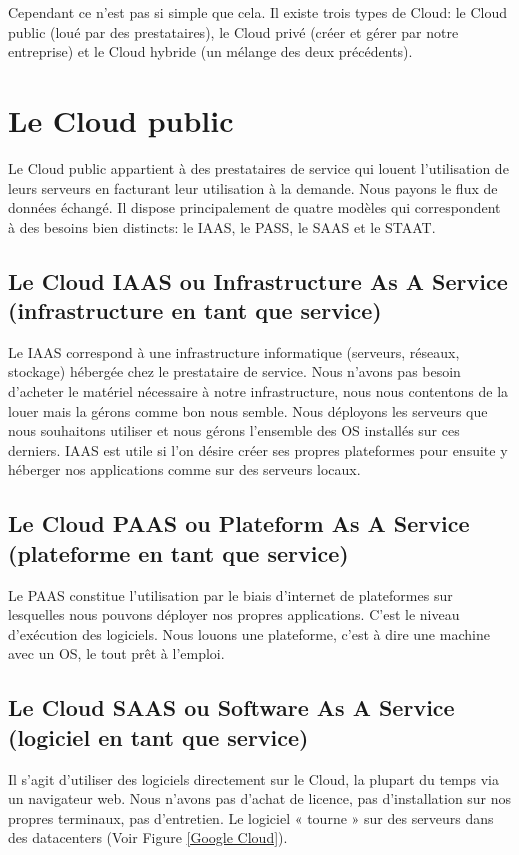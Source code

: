   Cependant ce n’est pas si simple que cela. Il existe trois types de Cloud: le Cloud public (loué par des prestataires), le Cloud privé (créer et gérer par notre entreprise) et le Cloud hybride (un mélange des deux précédents).

  \section{Le Cloud public}
  Le Cloud public appartient à des prestataires de service qui louent l’utilisation de leurs serveurs en facturant leur utilisation à la demande. Nous payons le flux de données échangé. Il dispose principalement de quatre modèles qui correspondent à des besoins bien distincts: le IAAS, le PASS, le SAAS et le STAAT.

    \subsection{Le Cloud IAAS ou Infrastructure As A Service (infrastructure en tant que service)}
    Le IAAS correspond à une infrastructure informatique (serveurs, réseaux, stockage) hébergée chez le prestataire de service. Nous n’avons pas besoin d’acheter le matériel nécessaire à notre infrastructure, nous nous contentons de la louer mais la gérons comme bon nous semble. Nous déployons les serveurs que nous souhaitons utiliser et nous gérons l’ensemble des OS installés sur ces derniers. IAAS est utile si l’on désire créer ses propres plateformes pour ensuite y héberger nos applications comme sur des serveurs locaux.

    \subsection{Le Cloud PAAS ou Plateform As A Service (plateforme en tant que service)}
    Le PAAS constitue l’utilisation par le biais d’internet de plateformes sur lesquelles nous pouvons déployer nos propres applications. C’est le niveau d’exécution des logiciels. Nous louons une plateforme, c’est à dire une machine avec un OS, le tout prêt à l’emploi.

    \subsection{Le Cloud SAAS ou Software As A Service (logiciel en tant que service)}
    Il s’agit d’utiliser des logiciels directement sur le Cloud, la plupart du temps via un navigateur web. Nous n’avons pas d’achat de licence, pas d’installation sur nos propres terminaux, pas d’entretien. Le logiciel « tourne » sur des serveurs dans des datacenters (Voir Figure \ref{Google Cloud}).

